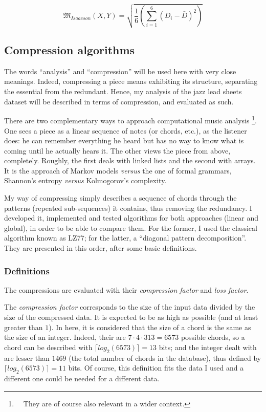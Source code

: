 \documentclass[a4paper,10pt]{article}
\newcommand{\guill}[1]{``#1''}
\begin{document}
\begin{equation*}
\mathfrak{M}_{Isaacson}(X,Y) = \sqrt{\frac{1}{6}\left(\sum_{i=1}^6\left(D_i-\bar{D}\right)^2\right)}
\end{equation*}


\subsection{Compression algorithms}

The words \guill{analysis} and \guill{compression} will be used here with very close meanings. Indeed, compressing a piece means exhibiting its structure, separating the essential from the redundant. Hence, my analysis of the jazz lead sheets dataset will be described in terms of compression, and evaluated as such.

There are two complementary ways to approach computational music analysis
\footnote{~~They are of course also relevant in a wider context.}. 
One sees a piece as a linear sequence of notes (or chords, etc.), as the listener does: he can remember everything he heard but has no way to know what is coming until he actually hears it. The other views the piece from above, completely. Roughly, the first deals with linked lists and the second with arrays. It is the approach of Markov models \emph{versus} the one of formal grammars, Shannon's entropy \emph{versus} Kolmogorov's complexity.

My way of compressing simply describes a sequence of chords through the patterns (repeated sub-sequences) it contains, thus removing the redundancy. I developed it, implemented and tested algorithms for both approaches (linear and global), in order to be able to compare them. For the former, I used the classical algorithm known as LZ77; for the latter, a \guill{diagonal pattern decomposition}. They are presented in this order, after some basic definitions.


\subsubsection{Definitions}

The compressions are evaluated with their \emph{compression factor} and \emph{loss factor}.

The \emph{compression factor} corresponds to the size of the input data divided by the size of the compressed data. It is expected to be as high as possible (and at least greater than $1$). In here, it is considered that the size of a chord is the same as the size of an integer. Indeed, their are $7\cdot4\cdot313=6573$ possible chords, so a chord can be described with $\lceil log_2(6573)\rceil = 13$ bits; and the integer dealt with are lesser than $1469$ (the total number of chords in the database), thus defined by $\lceil log_2(6573)\rceil = 11$ bits. Of course, this definition fits the data I used and a different one could be needed for a different data.
\end{document}
